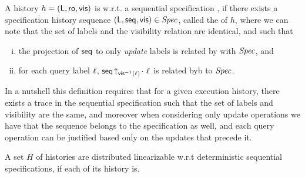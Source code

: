 \begin{definition}[\CRDTLin{}]
  \label{definition:distributed linearizability} A history $h =
  (\mathsf{L},\mathsf{ro},\mathsf{vis})$ is \CRDTLin{} w.r.t.
  a  sequential specification
  \Spec{}, if there exists a specification history sequence
  $(\mathsf{L}, \mathsf{seq}, \mathsf{vis}) \in \mathit{Spec}{}$, called the
  \crdtlinearization{} of $h$, where we can note that the set of labels
  and the visibility relation are identical, and such that %
\begin{enumerate}[(i)]
\item the projection of $\mathsf{seq}$ to only \emph{update} labels is
  related by \hwlin{} with $\mathit{Spec}$, and
\item for each query label $\ell$,
  $\mathsf{seq}\!\uparrow_{\mathsf{vis}^{-1}(\ell)}\!
  \cdot\ \ell$ is related byb \hwlin{} to $\mathit{Spec}$.
\end{enumerate}



 In a nutshell this definition requires that for a given
execution history, there exists a trace in the sequential
specification such that the set of labels and visibility are the same,
and moreover when considering only update operations we have that the
sequence belongs to the specification as well, and each query
operation can be justified based only on the updates that precede it.

A set $H$ of histories are distributed linearizable w.r.t deterministic sequential specifications, if each of its history is.
\end{definition}


